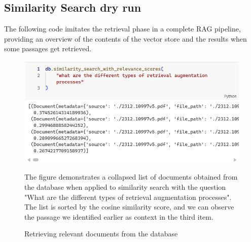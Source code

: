 \subsection{Similarity Search dry run}
The following code imitates the retrieval phase in a complete RAG pipeline, providing an overview of the contents of the vector store and the results when some passages get retrieved.\newline
\begin{figure}[H]
    \centering
    \includegraphics[width=\linewidth]{./figures/vectorstoresimilaritysearchwithscore_code.png}
    \caption{Retrieving relevant documents from the database}
    \begin{flushleft}
        \par The figure demonstrates a collapsed list of documents obtained from the database when applied to similarity search with the question "What are the different types of retrieval augmentation processes". The list is sorted by the cosine similarity score, and we can observe the passage we identified earlier as context in the third item.
    \end{flushleft}
\end{figure}
